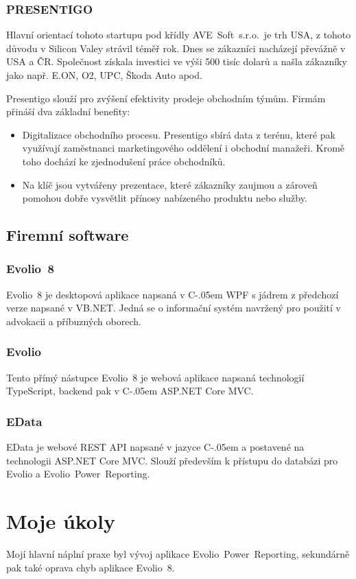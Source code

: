 \documentclass[czech,bachelor,dept460,male,csharp]{diploma}
\newcommand{\AveSoft}{AVE~Soft~s.r.o.}
\newcommand{\EvolioEight}{Evolio~8}
\newcommand{\EFilters}{Evolio~Power~Reporting}
\newcommand{\EvolioX}{Evolio}
\newcommand{\EData}{EData}
\newcommand{\Csharp}{%
  {\settoheight{\dimen0}{C}C\kern-.05em \resizebox{!}{\dimen0}{\raisebox{\depth}{\#}}}}
\begin{document}
 		\subsubsection{PRESENTIGO}
 		Hlavní orientací tohoto startupu pod křídly \AveSoft\ je trh USA, z tohoto důvodu v Silicon Valey strávil téměř rok. Dnes se zákazníci nacházejí převážně v USA a ČR. Společnost získala investici ve výši 500 tisíc dolarů a našla zákazníky jako např. E.ON, O2, UPC, Škoda Auto apod.

		Presentigo slouží pro zvýšení efektivity prodeje obchodním týmům. Firmám přináší dva základní benefity:
		\begin{itemize}
			\item
			Digitalizace obchodního procesu. Presentigo sbírá data z terénu, které pak využívají zaměstnanci marketingového oddělení i obchodní manažeři. Kromě toho dochází ke zjednodušení práce obchodníků.
			\item
			Na klíč jsou vytvářeny prezentace, které zákazníky zaujmou a zároveň pomohou dobře vysvětlit přínosy nabízeného produktu nebo služby.
		\end{itemize}
	\subsection{Firemní software}
		\subsubsection{\EvolioEight}
		{\EvolioEight} je desktopová aplikace napsaná v {\Csharp} WPF s jádrem z předchozí verze napsané v VB.NET. Jedná se o informační systém navržený pro použití v advokacii a příbuzných oborech. 
		\subsubsection{\EvolioX}
		Tento přímý nástupce {\EvolioEight} je webová aplikace napsaná technologií TypeScript, backend pak v {\Csharp} ASP.NET Core MVC.
		\subsubsection{\EData}
		{\EData} je webové REST API napsané v jazyce {\Csharp} a postavené na technologii ASP.NET Core MVC.
		Slouží především k přístupu do databázi pro {\EvolioX} a {\EFilters}.
\section{Moje úkoly}
	Mojí hlavní náplní praxe byl vývoj aplikace {\EFilters}, sekundárně pak také oprava chyb aplikace {\EvolioEight}.
\end{document}
